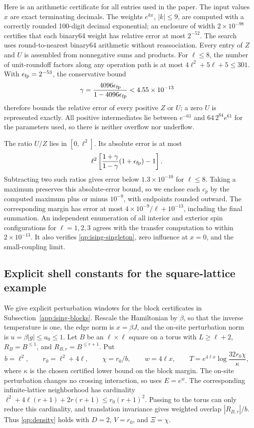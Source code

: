 Here is an arithmetic certificate for all entries used in the paper.
The input values $x$ are exact terminating decimals. The weights
$e^{kx}$, $|k|\le9$, are computed with a correctly rounded
100-digit decimal exponential; an enclosure of width $2\times10^{-98}$
certifies that each binary64 weight has relative error at most
$2^{-52}$. The search uses round-to-nearest binary64 arithmetic
without reassociation. Every entry of $Z$ and $U$ is assembled from
nonnegative sums and products. For $\ell\le8$, the number of
unit-roundoff factors along any operation path is at most
$4\ell^2+5\ell+5\le301$. With $\epsilon_{\rm fp}=2^{-53}$, the
conservative bound
\[
 \gamma=\frac{4096\epsilon_{\rm fp}}{1-4096\epsilon_{\rm fp}}
 <4.55\times10^{-13}
\]
therefore bounds the relative error of every positive $Z$ or $U$;
a zero $U$ is represented exactly. All positive intermediates lie
between $e^{-61}$ and $64\,2^{64}e^{61}$ for the parameters used,
so there is neither overflow nor underflow.

The ratio $U/Z$ lies in $[0,\ell^2]$. Its absolute error is at most
\[
 \ell^2\left[\frac{1+\gamma}{1-\gamma}
                       (1+\epsilon_{\rm fp})-1\right].
\]
Subtracting two such ratios gives error below $1.3\times10^{-10}$
for $\ell\le8$. Taking a maximum preserves this absolute-error
bound, so we enclose each $c_p$ by the computed maximum plus or
minus $10^{-9}$, with endpoints rounded outward. The corresponding
margin has error at most $4\times10^{-9}/\ell+10^{-13}$, including
the final summation. An independent enumeration of all interior
and exterior spin configurations for $\ell=1,2,3$ agrees with the
transfer computation to within $2\times10^{-13}$. It also verifies
\eqref{qp:ising-singleton}, zero influence at $x=0$, and the
small-coupling limit.

\subsection{Explicit shell constants for the square-lattice example}
\label{app:ising-shell-constants}

We give explicit perturbation windows for the block certificates in
Subsection~\ref{app:ising-blocks}. Rescale the Hamiltonian by $\beta$, so that
the inverse temperature is one, the edge norm is $x=\beta J$, and the
on-site perturbation norm is $u=\beta|g|\le u_0\le1$.
Let $B$ be an $\ell\times\ell$ square on a torus with $L\ge\ell+2$,
$R_B=B^{\le1}$, and $R_{B,r}=B^{\le r+1}$. Put
\begin{equation}
 b=\ell^2,\qquad r_0=\ell^2+4\ell,\qquad
 \chi=r_0/b,\qquad w=4\ell x,\qquad
 T=e^{4\ell x}\log\frac{32r_0\chi}{\kappa},
 \label{qp:ising-parameters}
\end{equation}
where $\kappa$ is the chosen certified lower bound on the block margin.
The on-site perturbation changes no crossing interaction, so
 uses $E=e^w$.
The corresponding infinite-lattice neighborhood has cardinality
$\ell^2+4\ell(r+1)+2r(r+1)\le r_0(r+1)^2$.
Passing to the torus can only reduce this cardinality, and translation
invariance gives weighted overlap $|R_{B,r}|/b$. Thus
\eqref{qp:density} holds with $D=2$, $V=r_0$, and $\Xi=\chi$.

